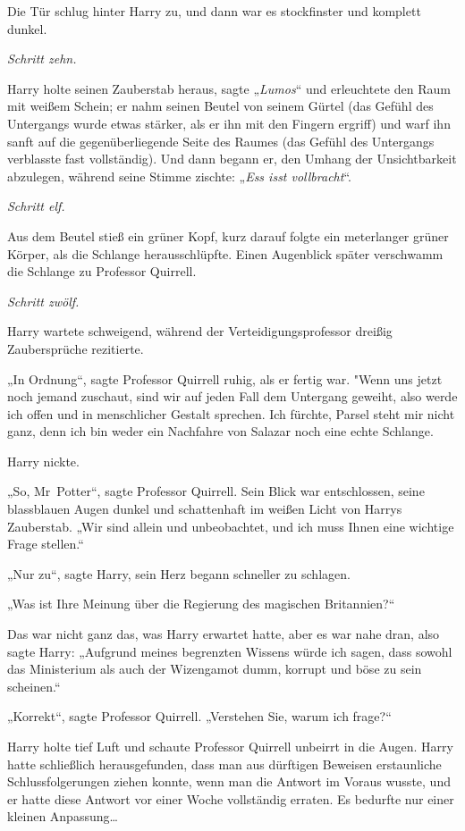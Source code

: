 {Die Tür schlug hinter Harry zu, und dann war es stockfinster und komplett dunkel.

\emph{Schritt zehn.}

Harry holte seinen Zauberstab heraus, sagte „\emph{Lumos}“ und erleuchtete den Raum mit weißem Schein; er nahm seinen Beutel von seinem Gürtel (das Gefühl des Untergangs wurde etwas stärker, als er ihn mit den Fingern ergriff) und warf ihn sanft auf die gegenüberliegende Seite des Raumes (das Gefühl des Untergangs verblasste fast vollständig). Und dann begann er, den Umhang der Unsichtbarkeit abzulegen, während seine Stimme zischte: „\emph{Ess isst vollbracht}“.

\emph{Schritt elf.}

Aus dem Beutel stieß ein grüner Kopf, kurz darauf folgte ein meterlanger grüner Körper, als die Schlange herausschlüpfte. Einen Augenblick später verschwamm die Schlange zu Professor Quirrell.

\emph{Schritt zwölf.}

Harry wartete schweigend, während der Verteidigungsprofessor dreißig Zaubersprüche rezitierte.

„In Ordnung“, sagte Professor Quirrell ruhig, als er fertig war. "Wenn uns jetzt noch jemand zuschaut, sind wir auf jeden Fall dem Untergang geweiht, also werde ich offen und in menschlicher Gestalt sprechen. Ich fürchte, Parsel steht mir nicht ganz, denn ich bin weder ein Nachfahre von Salazar noch eine echte Schlange.

Harry nickte.

„So, Mr~Potter“, sagte Professor Quirrell. Sein Blick war entschlossen, seine blassblauen Augen dunkel und schattenhaft im weißen Licht von Harrys Zauberstab. „Wir sind allein und unbeobachtet, und ich muss Ihnen eine wichtige Frage stellen.“

„Nur zu“, sagte Harry, sein Herz begann schneller zu schlagen.

„Was ist Ihre Meinung über die Regierung des magischen Britannien?“

Das war nicht ganz das, was Harry erwartet hatte, aber es war nahe dran, also sagte Harry: „Aufgrund meines begrenzten Wissens würde ich sagen, dass sowohl das Ministerium als auch der Wizengamot dumm, korrupt und böse zu sein scheinen.“

„Korrekt“, sagte Professor Quirrell. „Verstehen Sie, warum ich frage?“

Harry holte tief Luft und schaute Professor Quirrell unbeirrt in die Augen. Harry hatte schließlich herausgefunden, dass man aus dürftigen Beweisen erstaunliche Schlussfolgerungen ziehen konnte, wenn man die Antwort im Voraus wusste, und er hatte diese Antwort vor einer Woche vollständig erraten. Es bedurfte nur einer kleinen Anpassung…

}
